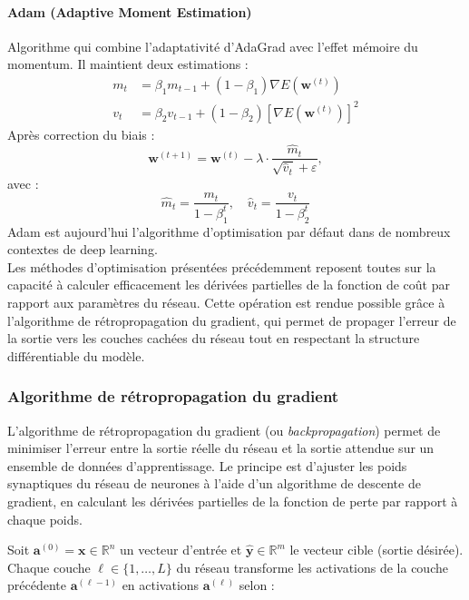 \paragraph{Adam (Adaptive Moment Estimation)}
Algorithme qui combine l’adaptativité d’AdaGrad avec l’effet mémoire du momentum. Il maintient deux estimations :
\begin{align}
    m_t &= \beta_1 m_{t-1} + (1 - \beta_1) \nabla E(\boldsymbol{w}^{(t)}) \\
    v_t &= \beta_2 v_{t-1} + (1 - \beta_2) \left[\nabla E(\boldsymbol{w}^{(t)})\right]^2
\end{align}
Après correction du biais :
\begin{equation}
    \boldsymbol{w}^{(t+1)} = \boldsymbol{w}^{(t)} - \lambda \cdot \frac{\hat{m}_t}{\sqrt{\hat{v}_t} + \varepsilon},
\end{equation}
avec :
\begin{equation}
    \hat{m}_t = \frac{m_t}{1 - \beta_1^t}, \quad \hat{v}_t = \frac{v_t}{1 - \beta_2^t}
\end{equation}
Adam est aujourd’hui l’algorithme d’optimisation par défaut dans de nombreux contextes de deep learning.\\

Les méthodes d’optimisation présentées précédemment reposent toutes sur la capacité à calculer efficacement les dérivées partielles de la fonction de coût par rapport aux paramètres du réseau. Cette opération est rendue possible grâce à l’algorithme de rétropropagation du gradient, qui permet de propager l’erreur de la sortie vers les couches cachées du réseau tout en respectant la structure différentiable du modèle. 

\subsubsection{Algorithme de rétropropagation du gradient}\label{sec:retropropagation}

L'algorithme de rétropropagation du gradient (ou 	\textit{backpropagation}) \citep{lecun1998gradient} permet de minimiser l'erreur entre la sortie réelle du réseau et la sortie attendue sur un ensemble de données d’apprentissage. Le principe est d’ajuster les poids synaptiques du réseau de neurones à l’aide d’un algorithme de descente de gradient, en calculant les dérivées partielles de la fonction de perte par rapport à chaque poids.

\newpage

Soit \( \textbf{a}^{(0)}=\mathbf{x} \in \mathbb{R}^n \) un vecteur d'entrée et \( \mathbf{\widehat{y}} \in \mathbb{R}^m \) le vecteur cible (sortie désirée). Chaque couche \( \ell \in \{1, \dots, L\} \) du réseau transforme les activations de la couche précédente \( \mathbf{a}^{(\ell-1)} \) en activations \( \mathbf{a}^{(\ell)} \) selon :

